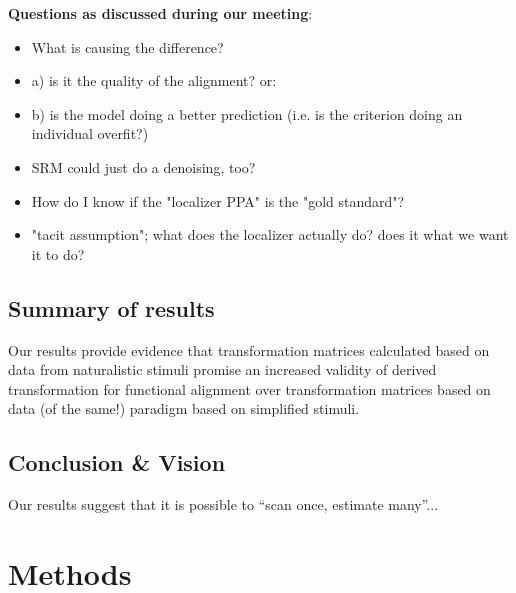 \textbf{Questions as discussed during our meeting}:
\begin{itemize}

    \item What is causing the difference?

    \item a) is it the quality of the alignment? or:

    \item b) is the model doing a better prediction
        (i.e. is the criterion doing an individual overfit?)

    \item SRM could just do a denoising, too?

    \item How do I know if the "localizer PPA" is the "gold standard"?

    \item "tacit assumption"; what does the localizer actually do?
        does it what we want it to do?

\end{itemize}


\subsection{Summary of results}


%
Our results provide evidence that transformation matrices calculated based
on data from naturalistic stimuli promise an increased validity of derived
transformation for functional alignment over transformation matrices based on
data (of the same!) paradigm based on simplified stimuli.



\subsection{Conclusion \& Vision}


Our results suggest that it is possible to ``scan once, estimate many''...



\section{Methods}


